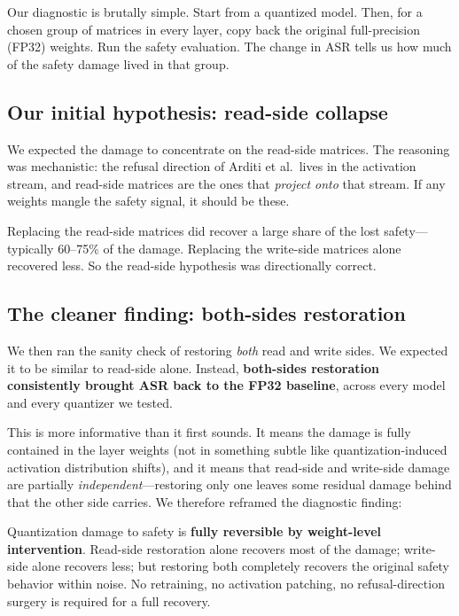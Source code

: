 \documentclass[11pt]{article}
\begin{document}
Our diagnostic is brutally simple. Start from a quantized model. Then, for a chosen group of matrices in every layer, copy back the original full-precision (FP32) weights. Run the safety evaluation. The change in ASR tells us how much of the safety damage lived in that group.

\subsection{Our initial hypothesis: read-side collapse}

We expected the damage to concentrate on the read-side matrices. The reasoning was mechanistic: the refusal direction of Arditi et al.\ lives in the activation stream, and read-side matrices are the ones that \emph{project onto} that stream. If any weights mangle the safety signal, it should be these.

Replacing the read-side matrices did recover a large share of the lost safety---typically 60--75\% of the damage. Replacing the write-side matrices alone recovered less. So the read-side hypothesis was directionally correct.

\subsection{The cleaner finding: both-sides restoration}

We then ran the sanity check of restoring \emph{both} read and write sides. We expected it to be similar to read-side alone. Instead, \textbf{both-sides restoration consistently brought ASR back to the FP32 baseline}, across every model and every quantizer we tested.

This is more informative than it first sounds. It means the damage is fully contained in the layer weights (not in something subtle like quantization-induced activation distribution shifts), and it means that read-side and write-side damage are partially \emph{independent}---restoring only one leaves some residual damage behind that the other side carries. We therefore reframed the diagnostic finding:

\begin{findingbox}
Quantization damage to safety is \textbf{fully reversible by weight-level intervention}. Read-side restoration alone recovers most of the damage; write-side alone recovers less; but restoring both completely recovers the original safety behavior within noise. No retraining, no activation patching, no refusal-direction surgery is required for a full recovery.
\end{findingbox}
\end{document}
